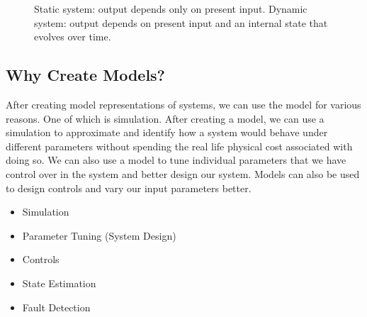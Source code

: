 \documentclass[11pt]{article}
\begin{document}
\begin{figure}[h]
\centering
{}
\caption{Static system: output depends only on present input. Dynamic system: output depends on present input and an internal state that evolves over time.}
\end{figure}

\subsection{Why Create Models?}
After creating model representations of systems, we can use the model for various reasons.
One of which is simulation. 
After creating a model, we can use a simulation to approximate and identify how a system would behave under different parameters without spending the real life physical cost associated with doing so.
We can also use a model to tune individual parameters that we have control over in the system and better design our system.
Models can also be used to design controls and vary our input parameters better.
\begin{itemize}
    \item Simulation
    \item Parameter Tuning (System Design)
    \item Controls
    \item State Estimation
    \item Fault Detection
\end{itemize}
\end{document}
